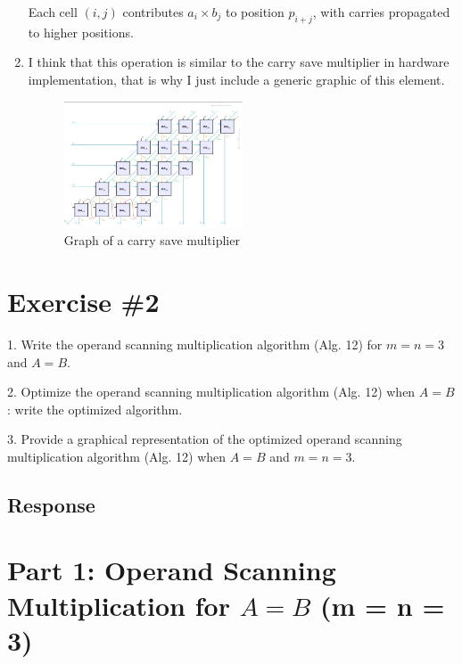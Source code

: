 \documentclass{article}
\begin{document}
\begin{enumerate}
Each cell $(i,j)$ contributes $a_i \times b_j$ to position $p_{i+j}$, with carries propagated to higher positions.

\item I think that this operation is similar to the carry save multiplier in hardware implementation, 
that is why I just include a generic graphic of this element.

\begin{figure}[hbt]
    \centering
    \includegraphics[width=0.5\textwidth]{carry_save_mult.jpeg}
    \caption{Graph of a carry save multiplier}
    \label{fig:carry_save_mult}
\end{figure}
  
\end{enumerate}

\section*{Exercise \#2}

1. Write the operand scanning multiplication algorithm (Alg. 12) for $m=n=3$ and $A=B$.

2. Optimize the operand scanning multiplication algorithm (Alg. 12) when $A=B$: write the optimized algorithm.

3. Provide a graphical representation of the optimized operand scanning multiplication algorithm  (Alg. 12) when $A=B$ and $m=n=3$.

\subsection*{Response}

\section{Part 1: Operand Scanning Multiplication for $A = B$ (m = n = 3)}
\end{document}

